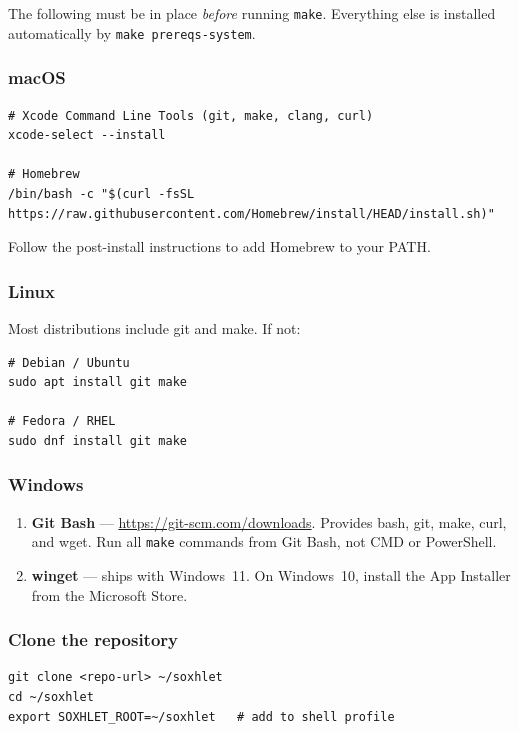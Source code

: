 \documentclass[11pt,letterpaper]{article}
\begin{document}
The following must be in place \emph{before} running \texttt{make}.
Everything else is installed automatically by \texttt{make prereqs-system}.

\subsubsection{macOS}

\begin{lstlisting}[style=shell]
# Xcode Command Line Tools (git, make, clang, curl)
xcode-select --install

# Homebrew
/bin/bash -c "$(curl -fsSL https://raw.githubusercontent.com/Homebrew/install/HEAD/install.sh)"
\end{lstlisting}

Follow the post-install instructions to add Homebrew to your PATH.

\subsubsection{Linux}

Most distributions include git and make. If not:

\begin{lstlisting}[style=shell]
# Debian / Ubuntu
sudo apt install git make

# Fedora / RHEL
sudo dnf install git make
\end{lstlisting}

\subsubsection{Windows}

\begin{enumerate}
  \item \textbf{Git Bash} --- \url{https://git-scm.com/downloads}. Provides
    bash, git, make, curl, and wget. Run all \texttt{make} commands from Git
    Bash, not CMD or PowerShell.
  \item \textbf{winget} --- ships with Windows~11. On Windows~10, install the
    App Installer from the Microsoft Store.
\end{enumerate}

\subsubsection{Clone the repository}

\begin{lstlisting}[style=shell]
git clone <repo-url> ~/soxhlet
cd ~/soxhlet
export SOXHLET_ROOT=~/soxhlet   # add to shell profile
\end{lstlisting}
\end{document}
